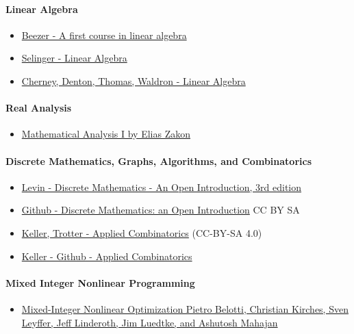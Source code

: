 \paragraph{\textbf{Linear Algebra}}
\begin{itemize}
\item\href{http://linear.ups.edu/html/fcla.html}{Beezer - A first course in linear algebra}
\item\href{https://github.com/selinger/linear-algebra}{Selinger - Linear Algebra}
\item\href{https://www.math.ucdavis.edu/~linear/linear-guest.pdf}{Cherney, Denton, Thomas, Waldron - Linear Algebra}
\end{itemize}

\paragraph{\textbf{Real Analysis}}
\begin{itemize}
\item\href{http://www.trillia.com/zakon-analysisI.html}{Mathematical Analysis I
by Elias Zakon}
\end{itemize}

\paragraph{\textbf{Discrete Mathematics, Graphs, Algorithms, and Combinatorics}}
\begin{itemize}
\item \href{http://discrete.openmathbooks.org/dmoi3.html}{Levin - Discrete Mathematics - An Open Introduction, 3rd edition}
\item \href{https://github.com/oscarlevin/discrete-book}{Github - Discrete Mathematics: an Open Introduction} CC BY SA
\item \href{http://www.rellek.net/book/frontmatter-1.html}{Keller, Trotter - Applied Combinatorics} (CC-BY-SA 4.0)
\item \href{https://github.com/mitchkeller/applied-combinatorics}{Keller - Github -  Applied Combinatorics}
\end{itemize}

\paragraph{\textbf{Mixed Integer Nonlinear Programming}}
\begin{itemize}
\item\href{https://www.mcs.anl.gov/papers/P3060-1112.pdf}{Mixed-Integer Nonlinear Optimization
Pietro Belotti, Christian Kirches, Sven Leyffer, Jeff Linderoth, Jim Luedtke, and Ashutosh
Mahajan}
\end{itemize}



